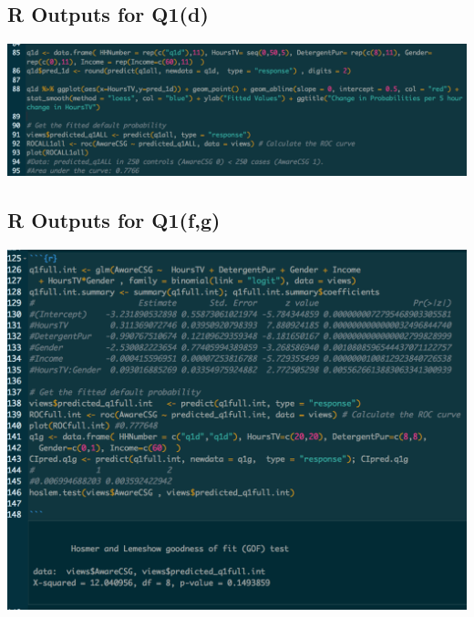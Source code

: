 \documentclass[10pt, oneside,spanish]{article}
\begin{document}
\pagebreak

\subsection{R Outputs for Q1(d)}

\begin{center}
\includegraphics[width=15cm]{1dcode.png}
\end{center}


\subsection{R Outputs for Q1(f,g)}


\begin{center}
\includegraphics[width=16cm]{intmodel.png}
\end{center}

\end{document}
